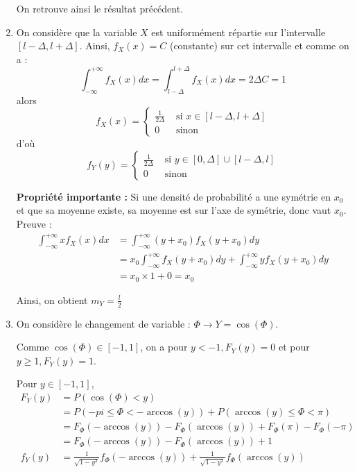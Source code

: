 \documentclass[main.tex]{subfiles}
\begin{document}
\begin{enumerate}
On retrouve ainsi le résultat précédent.

\item On considère que la variable $X$ est uniformément répartie sur l'intervalle $[l-\Delta,l+\Delta]$. Ainsi, $f_X(x) = C$ (constante) sur cet intervalle et comme on a :
\[ \int_{-\infty}^{+\infty} f_X(x) dx = \int_{l-\Delta}^{l+\Delta} f_X(x) dx = 2\Delta C = 1 \]
alors 
\[ f_X(x) = \left\{
\begin{array}{ll}
\frac{1}{2\Delta} & \text{ si } x \in [l-\Delta,l+\Delta] \\
0 & \text{ sinon }
\end{array}
\right.
\]
d'où
\[ f_Y(y) = \left\{
\begin{array}{ll}
\frac{1}{2\Delta} & \text{ si } y \in [0,\Delta]\cup[l-\Delta,l] \\
0 & \text{ sinon }
\end{array}
\right.
\]

\textbf{Propriété importante :} Si une densité de probabilité a une symétrie en $x_0$ et que sa moyenne existe, sa moyenne est sur l'axe de symétrie, donc vaut $x_0$.\\
Preuve : 
\begin{align*}
\int_{-\infty}^{+\infty} x f_X(x) dx & = \int_{-\infty}^{+\infty} (y+x_0) f_X(y+x_0) dy \\
& = x_0 \int_{-\infty}^{+\infty} f_X(y+x_0)dy + \int_{-\infty}^{+\infty} y f_X(y+x_0)dy \\
& = x_0 \times 1 + 0 = x_0
\end{align*}

Ainsi, on obtient $m_Y = \frac{l}{2}$

\item On considère le changement de variable : $\Phi \rightarrow Y = \cos(\Phi)$.

Comme $\cos(\Phi) \in [-1,1]$, on a pour $y < -1, F_Y(y) = 0$ et pour $y \geq 1, F_Y(y) = 1$.

Pour $y\in[-1,1]$, 
\begin{align*}
F_Y(y) & = P(\cos(\Phi) < y) \\
& = P(-pi \leq \Phi < -\arccos(y)) + P(\arccos(y) \leq \Phi < \pi)\\
& = F_{\Phi}(-\arccos(y)) - F_{\Phi}(\arccos(y)) + F_{\Phi}(\pi) - F_{\Phi}(-\pi) \\
& = F_{\Phi}(-\arccos(y)) - F_{\Phi}(\arccos(y)) + 1\\
f_Y(y) & = \frac{1}{\sqrt{1-y^2}}f_{\Phi}(-\arccos(y)) + \frac{1}{\sqrt{1-y^2}}f_{\Phi}(\arccos(y))
\end{align*} 


\end{enumerate}
\end{document}
